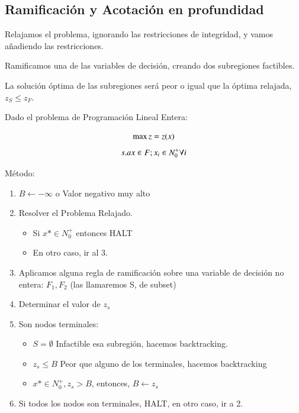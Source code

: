 \documentclass[12pt, twoside, openright]{report} %
\begin{document}
  \subsection{Ramificación y Acotación en profundidad}

  Relajamos el problema, ignorando las restricciones de integridad, y
  vamos añadiendo las restricciones.

  Ramificamos una de las variables de decisión, creando dos
    subregiones factibles.

  La solución óptima de las subregiones será peor o igual que la óptima
  relajada, \(z_S \leq z_F\).

    Dado el problema de Programación Lineal Entera:
	\vspace{-0.5cm}

	$$\max \space z= z(x)$$
	\vspace{-1cm}
    $$s.a \space x \in F; x_i \in N^+_0 \space \forall i$$

	Método:
	\vspace{-0.5cm}

    \begin{enumerate}

    \item
      $B ← -\infty$ o Valor negativo muy alto
    \item
      Resolver el Problema Relajado.

      \begin{itemize}
    	\vspace{-0.5cm}

      \item
        Si \(x* \in N^+_0\) entonces HALT
      \item
        En otro caso, ir al 3.
      \end{itemize}
    \item
      Aplicamos alguna regla de ramificación sobre una variable de
      decisión no entera: \(F_1, F_2\) (las llamaremos S, de subset)
    \item
      Determinar el valor de \(z_s\)
    \item
      Son nodos terminales:
	  \vspace{-0.5cm}

      \begin{itemize}
    
      \item
        \(S= \emptyset\) Infactible esa subregión, hacemos backtracking.
      \item
        \(z_s \leq B\) Peor que alguno de los terminales, hacemos
        backtracking
      \item
        \(x* \in N^+_0 , z_s > B\), entonces, \(B←z_s\)
      \end{itemize}
    \item
      Si todos los nodos son terminales, HALT, en otro caso, ir a 2.
    \end{enumerate}
\pagebreak
\end{document}
